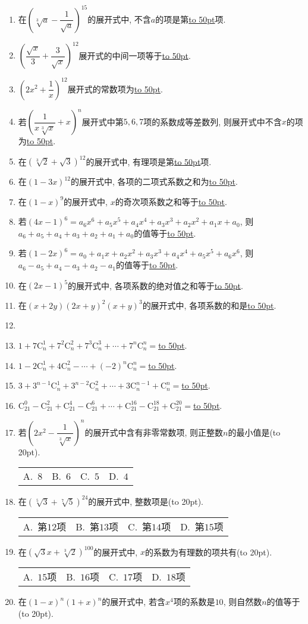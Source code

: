 \documentclass[10pt,a4paper]{article}
\newcommand{\blank}[1]{\underline{\hbox to #1pt{}}}
\newcommand{\bracket}[1]{(\hbox to #1pt{})}
\newcommand{\fourch}[4]{\par\begin{tabular}{p{.23\textwidth}p{.23\textwidth}p{.23\textwidth}p{.23\textwidth}}
A.~#1 &B.~#2& C.~#3& D.~#4
\end{tabular}}
\begin{document}
\begin{enumerate}[1.]
\item 在$(\sqrt[3]a-\dfrac 1{\sqrt a})^{15}$的展开式中, 不含$a$的项是第\blank{50}项.
\item $(\dfrac{\sqrt x}3+\dfrac 3{\sqrt x})^{12}$展开式的中间一项等于\blank{50}.
\item $(2x^2+\dfrac 1x)^{12}$展开式的常数项为\blank{50}.
\item 若$(\dfrac 1{x\sqrt[3]x}+x)^n$展开式中第$5, 6, 7$项的系数成等差数列, 则展开式中不含$x$的项为\blank{50}.
\item 在$(\sqrt[3]2+\sqrt 3)^{12}$的展开式中, 有理项是第\blank{50}项.
\item 在$(1-3x)^{12}$的展开式中, 各项的二项式系数之和为\blank{50}.
\item 在$(1-x)^9$的展开式中, $x$的奇次项系数之和等于\blank{50}.
\item 若$(4x-1)^6=a_6x^6+a_5x^5+a_4x^4+a_3x^3+a_2x^2+a_1x+a_0$, 则$a_6+a_5+a_4+a_3+a_2+a_1+a_0$的值等于\blank{50}.
\item 若$(1-2x)^6=a_0+a_1x+a_2x^2+a_3x^3+a_4x^4+a_5x^5+a_6x^6$, 则$a_6-a_5+a_4-a_3+a_2-a_1$的值等于\blank{50}.
\item 在$(2x-1)^5$的展开式中, 各项系数的绝对值之和等于\blank{50}.
\item 在$(x+2y)(2x+y)^2(x+y)^3$的展开式中, 各项系数的和是\blank{50}.
\item \item $1+7\mathrm{C}_n^1+7^2\mathrm{C}_n^2+7^3\mathrm{C}_n^3+\cdots+7^n\mathrm{C}_n^n=$\blank{50}.
\item $1-2\mathrm{C}_n^1+4\mathrm{C}_n^2-\cdots +(-2)^n\mathrm{C}_n^n=$\blank{50}.
\item $3+3^{n-1}\mathrm{C}_n^1+3^{n-2}\mathrm{C}_n^2+\cdots +3\mathrm{C}_n^{n-1}+\mathrm{C}_n^n=$\blank{50}.
\item $\mathrm{C}_{21}^0-\mathrm{C}_{21}^2+\mathrm{C}_{21}^4-\mathrm{C}_{21}^6+\cdots +\mathrm{C}_{21}^{16}-\mathrm{C}_{21}^{18}+\mathrm{C}_{21}^{20}=$\blank{50}.
\item 若$(2x^2-\dfrac 1{\sqrt[3]x})^n$的展开式中含有非零常数项, 则正整数$n$的最小值是\bracket{20}.
\fourch{$8$}{$6$}{$5$}{$4$}
\item 在$(\sqrt[5]3+\sqrt[7]5)^{24}$的展开式中, 整数项是\bracket{20}.
\fourch{第$12$项}{第$13$项}{第$14$项}{第$15$项}
\item 在$(\sqrt 3x+\sqrt[3]2)^{100}$的展开式中, $x$的系数为有理数的项共有\bracket{20}.
\fourch{$15$项}{$16$项}{$17$项}{$18$项}
\item 在$(1-x)^n(1+x)^n$的展开式中, 若含$x^4$项的系数是$10$, 则自然数$n$的值等于\bracket{20}.

\end{enumerate}
\end{document}
